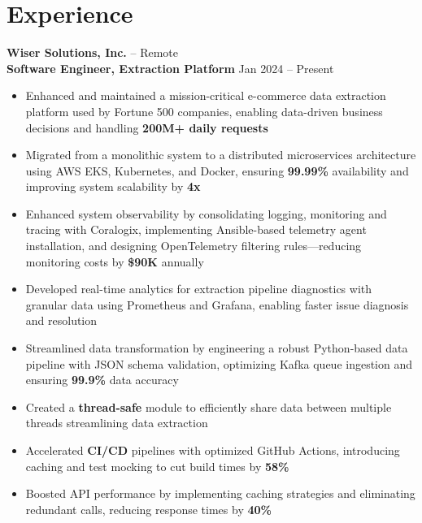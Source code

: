 \documentclass[11pt]{article}       %
\begin{document}
\section*{Experience}
\textbf{Wiser Solutions, Inc.} -- Remote \\
\textbf{Software Engineer, Extraction Platform} \hfill Jan 2024 -- Present \\
\vspace{-9pt}
\begin{itemize}
  \item Enhanced and maintained a mission-critical e-commerce data extraction platform used by Fortune 500 companies, enabling data-driven business decisions and handling \textbf{200M+ daily requests} \\
  \item Migrated from a monolithic system to a distributed microservices architecture using AWS EKS, Kubernetes, and Docker, ensuring \textbf{99.99\%} availability and improving system scalability by \textbf{4x} \\
  \item Enhanced system observability by consolidating logging, monitoring and tracing with Coralogix, implementing Ansible-based telemetry agent installation, and designing OpenTelemetry filtering rules—reducing monitoring costs by \textbf{\$90K} annually \\
  \item Developed real-time analytics for extraction pipeline diagnostics with granular data using Prometheus and Grafana, enabling faster issue diagnosis and resolution \\
  \item Streamlined data transformation by engineering a robust Python-based data pipeline with JSON schema validation, optimizing Kafka queue ingestion and ensuring \textbf{99.9\%} data accuracy \\
  \item Created a \textbf{thread-safe} module to efficiently share data between multiple threads streamlining data extraction \\
  \item Accelerated \textbf{CI/CD} pipelines with optimized GitHub Actions, introducing caching and test mocking to cut build times by \textbf{58\%} \\
  \item Boosted API performance by implementing caching strategies and eliminating redundant calls, reducing response times by \textbf{40\%} \\
\end{itemize}
\end{document}
